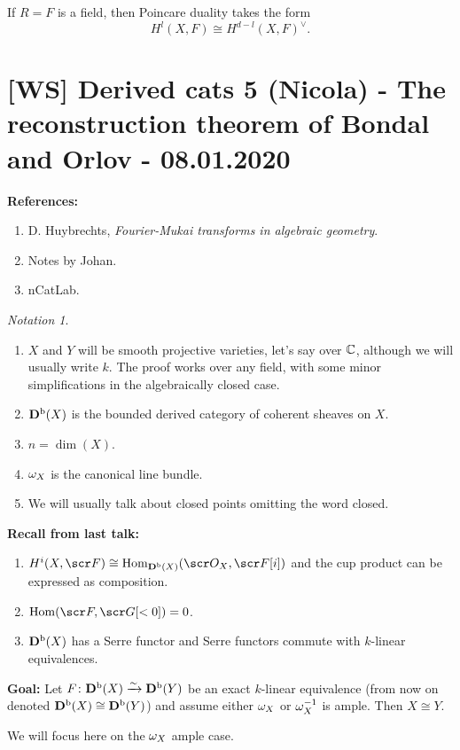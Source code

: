 \documentclass[A4paper, british, reqno]{amsart}
\theoremstyle{darkgreentheorem}
\theoremstyle{darkbluedefinition}
\theoremstyle{darkredexample}
\theoremstyle{remark}
\newtheorem{nota}[thm]{Notation}
\DeclareMathOperator{\Hom}{Hom}
\newcommand{\1}{\mathbbm{1}}
\newcommand{\dual}{^{\vee}}
\begin{document}
If $R=F$ is a field, then Poincare duality takes the form
\[ H^{l}(X,F)\cong H^{d-l}(X,F)\dual. \]

\section{[WS] Derived cats 5 (Nicola) - The reconstruction theorem of Bondal and Orlov - 08.01.2020}

\textbf{References:}
\begin{enumerate}
    \item D. Huybrechts, \textit{Fourier-Mukai transforms in algebraic geometry}.
    \item Notes by Johan.
    \item nCatLab.
\end{enumerate}

\begin{nota}
    \begin{enumerate}
	\item $X$ and $Y$ will be smooth projective varieties, let's say over $\mathbb{C}$, although we will usually write $k$.
	    The proof works over any field, with some minor simplifications in the algebraically closed case.
	\item $\mathbf{D}^{\mathrm{b}}(X)$ is the bounded derived category of coherent sheaves on $X$.
	\item $n=\dim(X)$.
	\item $\omega_{X}$ is the canonical line bundle.
	\item We will usually talk about closed points omitting the word closed.
    \end{enumerate}
\end{nota}

\textbf{Recall from last talk:}
\begin{enumerate}
    \item $H^{i}(X,\F)\cong \Hom_{\Db(X)}(\O_{X},\F[i])$ and the cup product can be expressed as composition.
    \item $\Hom(\F,\G[<0])=0$.
    \item $\mathbf{D}^{\mathrm{b}}(X)$ has a Serre functor and Serre functors commute with $k$-linear equivalences.
\end{enumerate}

\textbf{Goal:}
Let $F\colon \mathbf{D}^{\mathrm{b}}(X)\xrightarrow{\sim}\mathbf{D}^{\mathrm{b}}(Y)$ be an exact $k$-linear equivalence (from now on denoted $\mathbf{D}^{\mathrm{b}}(X)\cong \mathbf{D}^{\mathrm{b}}(Y)$) and assume either $\omega_{X}$ or $\omega_{X}^{-1}$ is ample.
Then $X\cong Y$.

We will focus here on the $\omega_{X}$ ample case.
\end{document}
